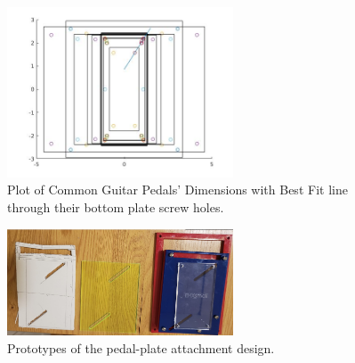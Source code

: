 \documentclass{article}
\begin{document}
			\begin{figure}
				\centering
				\includegraphics[width = 0.6\textwidth]{PR2Images/PedalBestFit.jpg}
				\caption{Plot of Common Guitar Pedals' Dimensions with Best Fit line through their bottom plate screw holes.}
				\label{fig:MATLABdimdata}
			\end{figure}

			\begin{figure}
				\centering
				\includegraphics[width = 0.6\textwidth]{PR2Images/PlatePrototype}
				\caption{Prototypes of the pedal-plate attachment design.}
				\label{fig:PlatePrototype}
			\end{figure}
\end{document}
